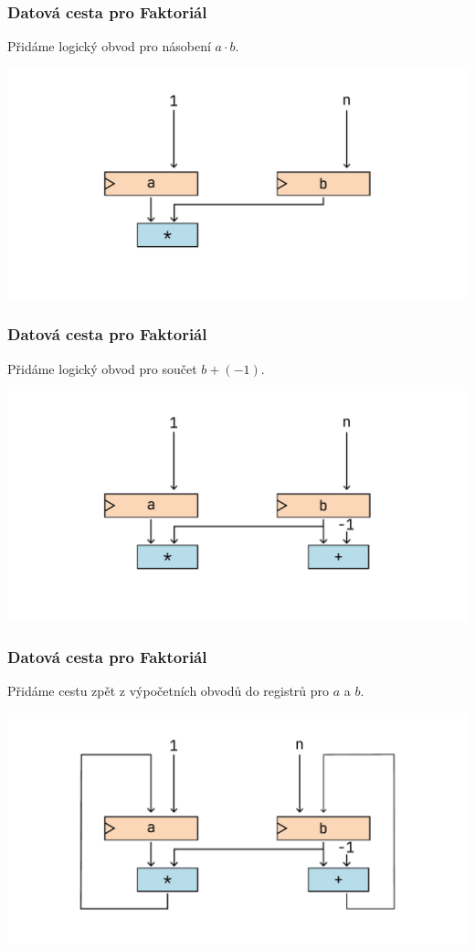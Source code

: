 \documentclass[aspectratio=169,11pt,svgnames,handout]{beamer}
\begin{document}
\begin{frame}
 \frametitle{Datová cesta pro Faktoriál}
 Přidáme logický obvod pro násobení $a \cdot b$.
 \begin{center}
  \includegraphics[width=.75\textwidth]{factorial-circuit-3.pdf}
 \end{center}
\end{frame}

\begin{frame}
 \frametitle{Datová cesta pro Faktoriál}
 Přidáme logický obvod pro součet $b + (-1)$.
 \begin{center}
  \includegraphics[width=.75\textwidth]{factorial-circuit-4.pdf}
 \end{center}
\end{frame}

\begin{frame}
 \frametitle{Datová cesta pro Faktoriál}
 Přidáme cestu zpět z výpočetních obvodů do registrů pro $a$ a $b$.
 \begin{center}
  \includegraphics[width=.75\textwidth]{factorial-circuit-5.pdf}
 \end{center}
\end{frame}
\end{document}
